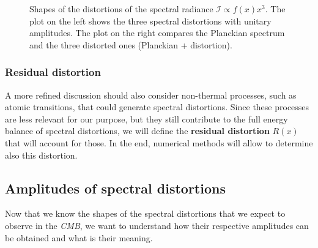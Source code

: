 \begin{figure}
\begin{multicols}{2}
\end{multicols}
\caption{Shapes of the distortions of the spectral radiance $\mathcal{I}\propto f(x)x^3$. The plot on the left shows the three spectral distortions with unitary amplitudes. The plot on the right compares the Planckian spectrum and the three distorted ones (Planckian + distortion).}
\label{fig:SD_shapes}
\end{figure}

\subsubsection{Residual distortion}
A more refined discussion should also consider non-thermal processes, such as atomic transitions, that could generate spectral distortions. Since these processes are less relevant for our purpose, but they still contribute to the full energy balance of spectral distortions, we will define the \textbf{residual distortion} $R(x)$ that will account for those. In the end, numerical methods will allow to determine also this distortion.


\subsection{Amplitudes of spectral distortions}\label{sec:SD_amplitudes}
Now that we know the shapes of the spectral distortions that we expect to observe in the \emph{CMB}, we want to understand how their respective amplitudes can be obtained and what is their meaning.

